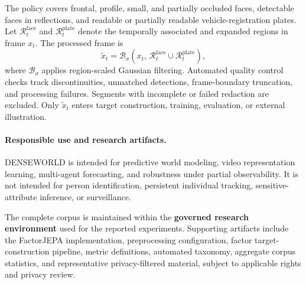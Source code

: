 The policy covers frontal, profile, small, and partially occluded faces,
detectable faces in reflections, and readable or partially readable
vehicle-registration plates. Let
\(\mathcal R_t^{\mathrm{face}}\) and
\(\mathcal R_t^{\mathrm{plate}}\) denote the temporally associated and
expanded regions in frame \(x_t\). The processed frame is
\begin{equation*}
\widetilde{x}_t
=
\mathcal B_{\sigma}
\left(
x_t,\,
\mathcal R_t^{\mathrm{face}}
\cup
\mathcal R_t^{\mathrm{plate}}
\right),
\end{equation*}
where \(\mathcal B_{\sigma}\) applies region-scaled Gaussian filtering.
Automated quality control checks track discontinuities, unmatched
detections, frame-boundary truncation, and processing failures.
Segments with incomplete or failed redaction are excluded. Only
\(\widetilde{x}_t\) enters target construction, training, evaluation,
or external illustration.

\paragraph{Responsible use and research artifacts.}
DENSEWORLD is intended for predictive world modeling, video
representation learning, multi-agent forecasting, and robustness under
partial observability. It is not intended for person identification,
persistent individual tracking, sensitive-attribute inference, or
surveillance.

The complete corpus is maintained within the \textbf{governed research
environment} used for the reported experiments. Supporting artifacts
include the FactorJEPA implementation, preprocessing configuration,
factor target-construction pipeline, metric definitions, automated
taxonomy, aggregate corpus statistics, and representative
privacy-filtered material, subject to applicable rights and privacy
review.

























































